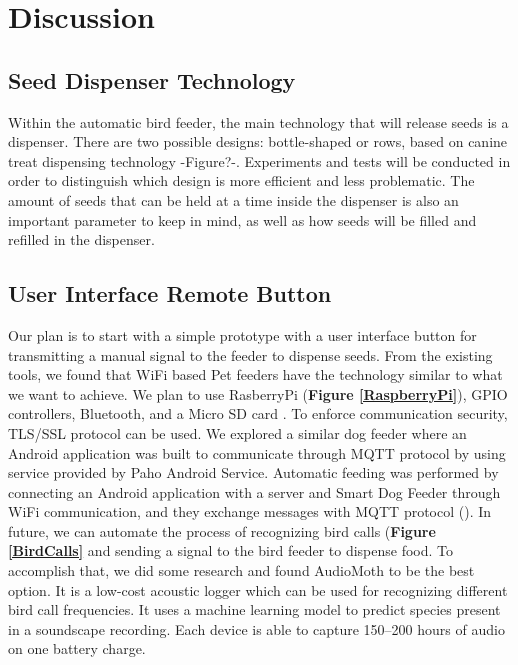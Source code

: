 \documentclass[11pt]{article}
\newcommand{\fig}[1]{{\bf Figure \ref{#1}}}
\begin{document}
\section{Discussion}

\subsection{Seed Dispenser Technology}
Within the automatic bird feeder, the main technology that will release seeds is a dispenser. There are two possible designs: bottle-shaped or rows, based on canine treat dispensing technology -Figure?-. Experiments and tests will be conducted in order to distinguish which design is more efficient and less problematic. The amount of seeds that can be held at a time inside the dispenser is also an important parameter to keep in mind, as well as how seeds will be filled and refilled in the dispenser.


\subsection{User Interface Remote Button}
Our plan is to start with a simple prototype with a user interface button for transmitting a manual signal to the feeder to dispense seeds. From the existing tools, we found that WiFi based Pet feeders have the technology similar to what we want to achieve. We plan to use RasberryPi (\fig{RaspberryPi}), GPIO controllers, Bluetooth, and a Micro SD card {\cite{10.1007/978-981-33-4443-3_15}}. To enforce communication security, TLS/SSL protocol can be used. We explored a similar dog feeder where an Android application was built to communicate through MQTT protocol by using service provided by Paho Android Service. Automatic feeding was performed by connecting an Android application with a server and Smart Dog Feeder through WiFi communication, and they exchange messages with MQTT protocol (\cite{7863048}). In future, we can automate the process of recognizing bird calls (\fig{BirdCalls} and sending a signal to the bird feeder to dispense food. To accomplish that, we did some research and found AudioMoth to be the best option. It is a low-cost acoustic logger which can be used for recognizing different bird call frequencies. It uses a machine learning model to predict species present in a soundscape recording. Each device is able to capture 150–200 hours of audio on one battery charge.
\end{document}
